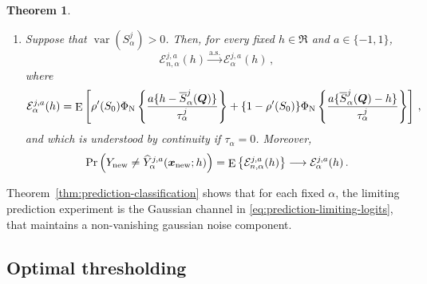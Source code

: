 \documentclass{article}
\DeclareMathOperator{\expect}{E}
\DeclareMathOperator{\var}{var}
\newtheorem{theorem}{Theorem}[section]
\theoremstyle{definition}
\newcommand*{\bb}{\boldsymbol}
\def\bx{\bb{x}}
\begin{document}
\begin{bibunit}
\begin{theorem}
\begin{enumerate}[label=(\roman*)]
\begin{equation}
        \left(
            \eta_0(\bx_{\rm new}),
            \hat\eta_\alpha^j(\bx_{\rm new}),
            Y_{\rm new}
        \right)
        \overset{\mathrm d}{\longrightarrow}
        \left(
            S_0,
            S_\alpha^j,
            Y
        \right) \,.
    \end{equation}
    The convergence also holds unconditionally.
    \item Suppose that $\var(S_\alpha^j)>0$. Then, for every fixed
    $h\in\Re$ and $a\in\{-1,1\}$,
    \begin{equation}
    \label{eq:prediction-risk-convergence}
        \mathcal E_{n,\alpha}^{j,a}(h)
        \overset{\mathrm{a.s.}}{\longrightarrow}
        \mathcal E_\alpha^{j,a}(h) \,,
    \end{equation}
    where
    \begin{equation}
    \label{eq:prediction-limiting-risk}
        \mathcal E_\alpha^{j,a}(h)
        =
        \expect\left[
            \rho'(S_0)
            \Phi_{\rm N}\left\{
                \frac{
                    a\{h-\overline S_\alpha^j(\bb Q)\}
                }{
                    \tau_\alpha^j
                }
            \right\}
            +
            \{1-\rho'(S_0)\}
            \Phi_{\rm N}\left\{
                \frac{
                    a\{\overline S_\alpha^j(\bb Q)-h\}
                }{
                    \tau_\alpha^j
                }
            \right\}
        \right] \,,
    \end{equation}
    and which is understood by continuity if $\tau_\alpha = 0$. Moreover,
    \begin{equation}
    \label{eq:prediction-unconditional-risk-convergence}
        \Pr\left(
            Y_{\rm new}
            \neq
            \widehat Y_\alpha^{j,a}(\bx_{\rm new};h)
        \right)
        =
        \expect\left\{
            \mathcal E_{n,\alpha}^{j,a}(h)
        \right\}
        \longrightarrow
        \mathcal E_\alpha^{j,a}(h) \,.
    \end{equation}
\end{enumerate}
\end{theorem}
\noindent
Theorem~\ref{thm:prediction-classification} shows that 
for each fixed $\alpha$, the limiting prediction experiment is the
Gaussian channel in \eqref{eq:prediction-limiting-logits}, that maintains a non-vanishing gaussian noise component. 

\subsection{Optimal thresholding}
\label{subsec:opt-threshold}


\end{bibunit}
\end{document}
